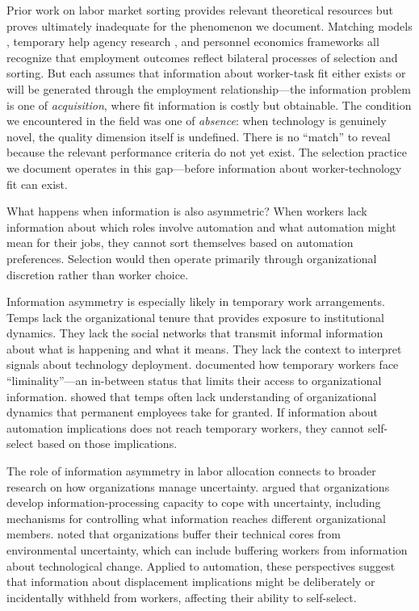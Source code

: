 \documentclass[12pt]{article}
\begin{document}
Prior work on labor market sorting provides relevant theoretical resources but proves ultimately inadequate for the phenomenon we document. Matching models \citep{jovanovic1979job}, temporary help agency research \citep{autor2009studies}, and personnel economics frameworks \citep{lazear1998personnel} all recognize that employment outcomes reflect bilateral processes of selection and sorting. But each assumes that information about worker-task fit either exists or will be generated through the employment relationship---the information problem is one of \textit{acquisition}, where fit information is costly but obtainable. The condition we encountered in the field was one of \textit{absence}: when technology is genuinely novel, the quality dimension itself is undefined. There is no ``match'' to reveal because the relevant performance criteria do not yet exist. The selection practice we document operates in this gap---before information about worker-technology fit can exist.

What happens when information is also asymmetric? When workers lack information about which roles involve automation and what automation might mean for their jobs, they cannot sort themselves based on automation preferences. Selection would then operate primarily through organizational discretion rather than worker choice.

Information asymmetry is especially likely in temporary work arrangements. Temps lack the organizational tenure that provides exposure to institutional dynamics. They lack the social networks that transmit informal information about what is happening and what it means. They lack the context to interpret signals about technology deployment. \citet{ashford2007guests} documented how temporary workers face ``liminality''---an in-between status that limits their access to organizational information. \citet{feldman1996underemployment} showed that temps often lack understanding of organizational dynamics that permanent employees take for granted. If information about automation implications does not reach temporary workers, they cannot self-select based on those implications.

The role of information asymmetry in labor allocation connects to broader research on how organizations manage uncertainty. \citet{galbraith1973designing} argued that organizations develop information-processing capacity to cope with uncertainty, including mechanisms for controlling what information reaches different organizational members. \citet{thompson1967organizations} noted that organizations buffer their technical cores from environmental uncertainty, which can include buffering workers from information about technological change. Applied to automation, these perspectives suggest that information about displacement implications might be deliberately or incidentally withheld from workers, affecting their ability to self-select.
\end{document}
